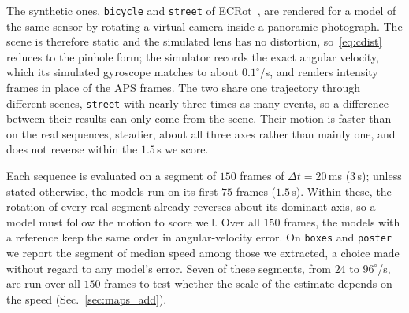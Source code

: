 \documentclass[journal]{IEEEtran}
\newcommand{\wvec}{\vec{\omega}}
\begin{document}
The synthetic ones, \texttt{bicycle} and \texttt{street} of ECRot~\cite{guo2024cmaxslam}, are rendered for a model of the same sensor by rotating a virtual camera inside a panoramic photograph. The scene is therefore static and the simulated lens has no distortion, so~\eqref{eq:cdist} reduces to the pinhole form; the simulator records the exact angular velocity, which its simulated gyroscope matches to about $0.1^\circ$/s, and renders intensity frames in place of the APS frames. The two share one trajectory through different scenes, \texttt{street} with nearly three times as many events, so a difference between their results can only come from the scene. Their motion is faster than on the real sequences, steadier, about all three axes rather than mainly one, and does not reverse within the $1.5$\,s we score.

Each sequence is evaluated on a segment of $150$ frames of $\Delta t = 20$\,ms ($3$\,s); unless stated otherwise, the models run on its first $75$ frames ($1.5$\,s). Within these, the rotation of every real segment already reverses about its dominant axis, so a model must follow the motion to score well. Over all $150$ frames, the models with a reference keep the same order in angular-velocity error. On \texttt{boxes} and \texttt{poster} we report the segment of median speed among those we extracted, a choice made without regard to any model's error. Seven of these segments, from $24$ to $96^\circ$/s, are run over all $150$ frames to test whether the scale of the estimate depends on the speed (Sec.~\ref{sec:maps_add}).


\end{document}
